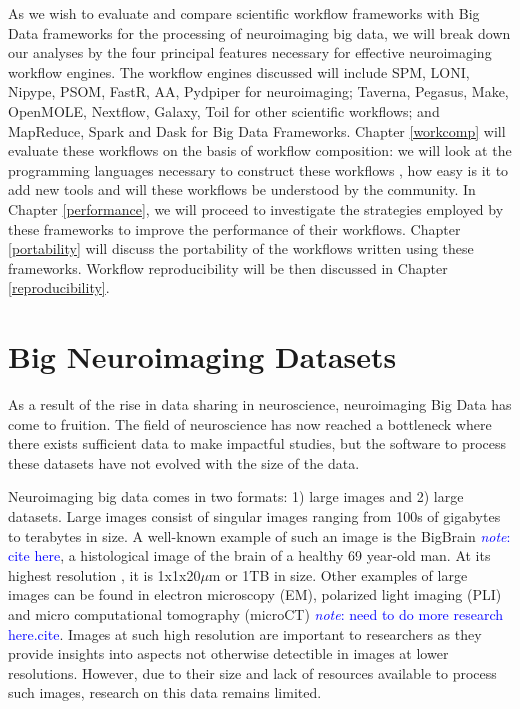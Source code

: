 \documentclass{report}
\newcommand{\note}[1]{\textcolor{blue}{\textit{note}: #1}}
\begin{document}
        As we wish to evaluate and compare scientific workflow frameworks with
        Big Data frameworks for the processing of neuroimaging big data, we will
        break down our analyses by the four principal features necessary for
        effective neuroimaging workflow engines. The workflow engines discussed
        will include SPM, LONI, Nipype, PSOM, FastR, AA, Pydpiper 
        for neuroimaging; Taverna, Pegasus, Make, OpenMOLE, Nextflow, Galaxy, 
        Toil for other scientific workflows; and MapReduce, Spark and Dask for
        Big Data Frameworks. Chapter \ref{workcomp} will evaluate these 
        workflows on the basis of workflow composition: we will %
        look at the programming languages necessary to construct these workflows
        , how easy is it to add new tools and will these workflows be understood
        by the community. In Chapter \ref{performance}, we will proceed to 
        investigate the strategies employed by these frameworks to improve the 
        performance of their workflows. Chapter \ref{portability} will discuss
        the portability of the workflows written using these frameworks. 
        Workflow reproducibility will be then discussed in Chapter 
        \ref{reproducibility}.
        

        \section{Big Neuroimaging Datasets}\label{datasets}

            As a result of the rise in data sharing in neuroscience, neuroimaging
            Big Data has come to fruition. The field of neuroscience has now
            reached a bottleneck where there exists sufficient data to make
            impactful studies, but the software to process these datasets have 
            not evolved with the size of the data.

            Neuroimaging big data comes in two formats: 1) large images and 2) 
            large datasets. Large images consist of singular images ranging 
            from 100s of gigabytes to terabytes in size. A well-known example of 
            such an image is the BigBrain \note{cite here}, a histological image 
            of the brain of a healthy 69 year-old man. At its highest resolution
            , it is 1x1x20$\mu$m or 1TB in
            size. Other examples of large images can be found in electron 
            microscopy (EM), polarized light imaging (PLI) and micro computational
            tomography (microCT) \note{need to do more research here.cite}. 
            Images at 
            such high resolution are important to researchers as they provide 
            insights into aspects not otherwise detectible in images at lower 
            resolutions. However, due to their size and lack of resources 
            available to process such images, research on this data remains 
            limited.
\end{document}
